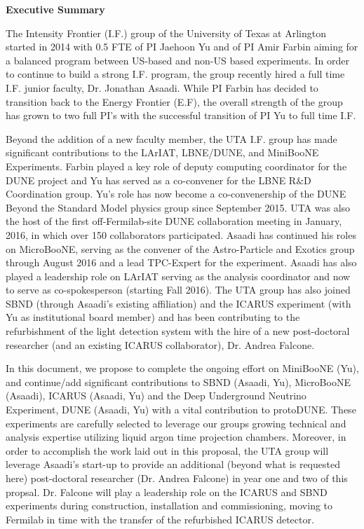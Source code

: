 \begin{center}
\textbf{ \Large{Executive Summary} }
\end{center}

The Intensity Frontier (I.F.) group of the University of Texas at Arlington started in 2014 with 0.5 FTE of PI Jaehoon Yu and of PI Amir Farbin aiming for a balanced program between US-based and non-US based experiments. In order to continue to build a strong I.F. program, the group recently hired a full time I.F. junior faculty, Dr. Jonathan Asaadi. While PI Farbin has decided to transition back to the Energy Frontier (E.F), the overall strength of the group has grown to two full PI's with the successful transition of PI Yu to full time I.F.

Beyond the addition of a new faculty member, the UTA I.F. group has made significant contributions to the LArIAT, LBNE/DUNE, and MiniBooNE Experiments. Farbin played a key role of deputy computing coordinator for the DUNE project and Yu has served as a co-convener for the LBNE R$\&$D Coordination group. Yu's role has now become a co-convenership of the DUNE Beyond the Standard Model physics group since September 2015. UTA was also the host of the first off-Fermilab-site DUNE collaboration meeting in January, 2016, in which over 150 collaborators participated. Asaadi has continued his roles on MicroBooNE, serving as the convener of the Astro-Particle and Exotics group through August 2016 and a lead TPC-Expert for the experiment. Asaadi has also played a leadership role on LArIAT serving as the analysis coordinator and now to serve as co-spokesperson (starting Fall 2016). The UTA group has also joined SBND (through Asaadi's existing affiliation) and the ICARUS experiment (with Yu as institutional board member) and has been contributing to the refurbishment of the light detection system with the hire of a new post-doctoral researcher (and an existing ICARUS collaborator), Dr. Andrea Falcone.

In this document, we propose to complete the ongoing effort on MiniBooNE (Yu), and continue/add significant contributions to SBND (Asaadi, Yu), MicroBooNE (Asaadi), ICARUS (Asaadi, Yu) and the Deep Underground Neutrino Experiment, DUNE (Asaadi, Yu) with a vital contribution to protoDUNE. These experiments are carefully selected to leverage our groups growing technical and analysis expertise utilizing liquid argon time projection chambers. Moreover, in order to accomplish the work laid out in this proposal, the UTA group will leverage Asaadi's start-up to provide an additional (beyond what is requested here) post-doctoral researcher (Dr. Andrea Falcone) in year one and two of this propsal. Dr. Falcone will play a leadership role on the ICARUS and SBND experiments during construction, installation and commissioning, moving to Fermilab in time with the transfer of the refurbished ICARUS detector.

